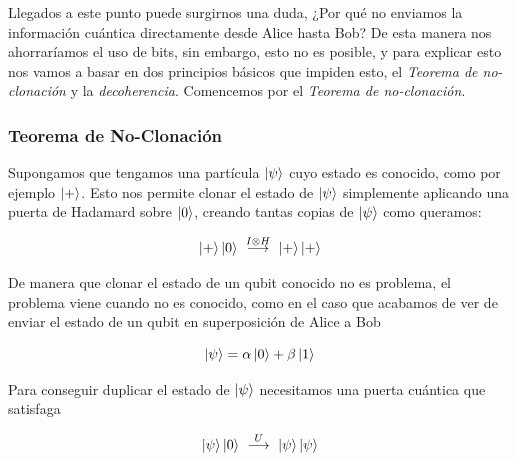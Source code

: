 \documentclass[12pt]{article}
\numberwithin{equation}{section} %
\begin{document}
    \vspace{5mm}

    Llegados a este punto puede surgirnos una duda, ¿Por qué no enviamos la información cuántica directamente desde Alice hasta Bob? De esta manera nos ahorraríamos el uso de bits, sin embargo, esto no es posible, y para explicar esto nos vamos a basar en dos principios básicos que impiden esto, el \textit{Teorema de no-clonación} y la \textit{decoherencia}. Comencemos por el \textit{Teorema de no-clonación}.

    \vspace{5mm}

    \subsubsection{Teorema de No-Clonación}\label{subsubsection: teorema_no_clonacion}

    \vspace{5mm}

    Supongamos que tengamos una partícula \( \ket{\psi} \) cuyo estado es conocido, como por ejemplo \( \ket{+} \). Esto nos permite clonar el estado de \( \ket{\psi} \) simplemente aplicando una puerta de Hadamard sobre \( \ket{0} \), creando tantas copias de \( \ket{\psi} \) como queramos:

    \begin{equation*}
        \ket{+} \ket{0} \ \overset{I \otimes H}{\longrightarrow} \ \ket{+} \ket{+}
    \end{equation*}

    \vspace{2.5mm}

    De manera que clonar el estado de un qubit conocido no es problema, el problema viene cuando no es conocido, como en el caso que acabamos de ver de enviar el estado de un qubit en superposición de Alice a Bob

    \begin{equation}
        \ket{\psi} = \alpha \ket{0} + \beta \ket{1}
    \end{equation}

    \vspace{2.5mm}

    Para conseguir duplicar el estado de \( \ket{\psi} \) necesitamos una puerta cuántica que satisfaga

    \begin{equation*}
        \ket{\psi} \ket{0} \ \overset{U}{\longrightarrow} \ \ket{\psi} \ket{\psi}
    \end{equation*}
\end{document}
